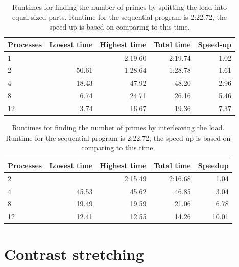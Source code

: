 \documentclass[a4paper]{article}
\begin{document}
\begin{table}[h]
	\centering
	\caption{Runtimes for finding the number of primes by splitting the load into equal sized parts. Runtime for the sequential program is 2:22.72, the speed-up is based on comparing to this time.}
	\label{tbl:prime}
	\begin{tabular}{l|r|r|r|r}
		Processes & Lowest time & Highest time & Total time & Speed-up \\ \hline
		 1 &  & 2:19.60 & 2:19.74 & 1.02 \\
		 2 & 50.61 & 1:28.64 & 1:28.78 & 1.61 \\
		 4 & 18.43 & 47.92 & 48.20 & 2.96 \\
		 8 &  6.74 & 24.71 & 26.16 & 5.46 \\
		12 &  3.74 & 16.67 & 19.36 & 7.37 \\
	\end{tabular}
\end{table}

\begin{table}[h]
	\centering
	\caption{Runtimes for finding the number of primes by interleaving the load. Runtime for the sequential program is 2:22.72, the speed-up is based on comparing to this time.}
	\label{tbl:prime2}
	\begin{tabular}{l|r|r|r|r}
		Processes & Lowest time & Highest time & Total time & Speedup \\ \hline
		 2 &    & 2:15.49 & 2:16.68 & 1.04 \\
	 	 4 & 45.53 & 45.62 & 46.85 & 3.04 \\
	 	 8 & 19.49 & 19.59 & 21.06 & 6.78 \\
		12 & 12.41 & 12.55 & 14.26 & 10.01 \\
	\end{tabular}
\end{table}

\section{Contrast stretching}
\end{document}
